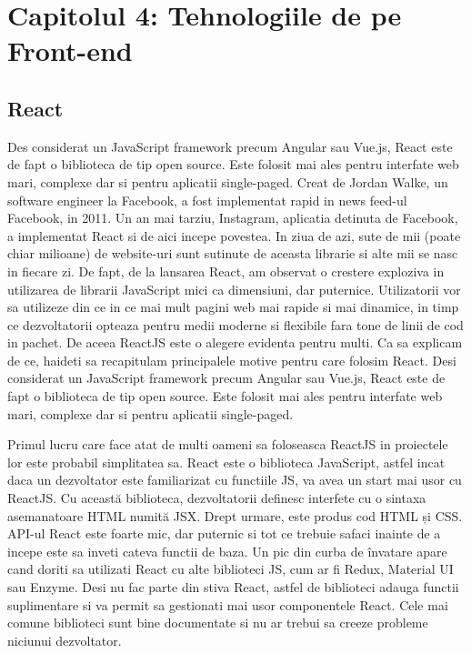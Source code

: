 \chapter{Capitolul 4: Tehnologiile de pe Front-end}
\label{chap:ch3}

\section{React}
\label{sec:ch4sec1}

\par Des considerat un JavaScript framework precum Angular sau Vue.js, React este de fapt o biblioteca de tip open source. Este folosit mai ales pentru interfate web mari, complexe dar si pentru aplicatii single-paged. Creat de Jordan Walke, un software engineer la Facebook, a fost implementat rapid in news feed-ul Facebook, in 2011. Un an mai tarziu, Instagram, aplicatia detinuta de Facebook, a implementat React si de aici incepe povestea. In ziua de azi, sute de mii (poate chiar milioane) de website-uri sunt sutinute de aceasta librarie si alte mii se nasc in fiecare zi. De fapt, de la lansarea React, am observat o crestere exploziva in utilizarea de librarii JavaScript mici ca dimensiuni, dar puternice. Utilizatorii vor sa utilizeze din ce in ce mai mult pagini web mai rapide si mai dinamice, in timp ce dezvoltatorii opteaza pentru medii moderne si flexibile fara tone de linii de cod in pachet. De aceea ReactJS este o alegere evidenta pentru multi. Ca sa explicam de ce, haideti sa recapitulam principalele motive pentru care folosim React. Desi considerat un JavaScript framework precum Angular sau Vue.js, React este de fapt o biblioteca de tip open source. Este folosit mai ales pentru interfate web mari, complexe dar si pentru aplicatii single-paged.
\par Primul lucru care face atat de multi oameni sa foloseasca ReactJS in proiectele lor este probabil simplitatea sa. React este o biblioteca JavaScript, astfel incat daca un dezvoltator este familiarizat cu functiile JS, va avea un start mai usor cu ReactJS. Cu această biblioteca, dezvoltatorii definesc interfete cu o sintaxa asemanatoare HTML numită JSX. Drept urmare, este produs cod HTML și CSS. API-ul React este foarte mic, dar puternic si tot ce trebuie safaci inainte de a incepe este sa inveti cateva functii de baza. Un pic din curba de învatare apare cand doriti sa utilizati React cu alte biblioteci JS, cum ar fi Redux, Material UI sau Enzyme. Desi nu fac parte din stiva React, astfel de biblioteci adauga functii suplimentare si va permit sa gestionati mai usor componentele React. Cele mai comune biblioteci sunt bine documentate si nu ar trebui sa creeze probleme niciunui dezvoltator.
